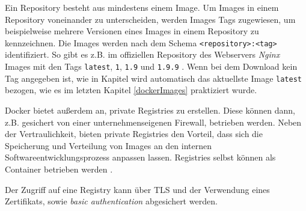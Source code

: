 \documentclass[../main.tex]{subfiles}
\begin{document}
      Ein Repository besteht aus mindestens einem Image. Um Images in einem Repository voneinander zu unterscheiden, werden Images Tags zugewiesen, um beispielweise mehrere Versionen eines Images in einem Repository zu kennzeichnen. Die Images werden nach dem Schema \texttt{<repository>:<tag>} identifiziert. So gibt es z.B. im offiziellen Repository des Webservers \emph{Nginx} Images mit den Tags \texttt{latest}, \texttt{1}, \texttt{1.9} und \texttt{1.9.9} \cite{dockerHubNginx}. Wenn bei dem Download kein Tag angegeben ist, wie in Kapitel wird automatisch das aktuellste Image \texttt{latest} bezogen, wie es im letzten Kapitel \ref{dockerImages} praktiziert wurde.





      Docker bietet außerdem an, private Registries zu erstellen. Diese können dann, z.B. gesichert von einer unternehmenseigenen Firewall, betrieben werden. Neben der Vertraulichkeit, bieten private Registries den Vorteil, dass sich die Speicherung und Verteilung von Images an den internen Softwareentwicklungsprozess anpassen lassen. Registries selbst können als Container betrieben werden \cite{dockerRegistry}.

      Der Zugriff auf eine Registry kann über \acrshort{TLS} und der Verwendung eines Zertifikats, sowie \emph{basic authentication} abgesichert werden.
\end{document}
